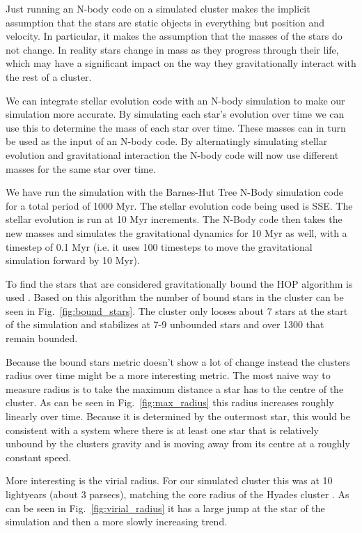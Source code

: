 \documentclass{aa}
\begin{document}
Just running an N-body code on a simulated cluster makes the implicit assumption that the stars are static objects in everything but position and velocity. In particular, it makes the assumption that the masses of the stars do not change. In reality stars change in mass as they progress through their life, which may have a significant impact on the way they gravitationally interact with the rest of a cluster.

We can integrate stellar evolution code with an N-body simulation to make our simulation more accurate. By simulating each star's evolution over time we can use this to determine the mass of each star over time. These masses can in turn be used as the input of an N-body code. By alternatingly simulating stellar evolution and gravitational interaction the N-body code will now use different masses for the same star over time.

We have run the simulation with the Barnes-Hut Tree N-Body simulation code \citep{1986Natur.324..446B} for a total period of 1000 Myr. The stellar evolution code being used is SSE. The stellar evolution is run at 10 Myr increments. The N-Body code then takes the new masses and simulates the gravitational dynamics for 10 Myr as well, with a timestep of 0.1 Myr (i.e. it uses 100 timesteps to move the gravitational simulation forward by 10 Myr).

To find the stars that are considered gravitationally bound the HOP algorithm is used \citep{1998ApJ...498..137E}. Based on this algorithm the number of bound stars in the cluster can be seen in Fig.~\ref{fig:bound_stars}. The cluster only looses about 7 stars at the start of the simulation and stabilizes at 7-9 unbounded stars and over 1300 that remain bounded. 

Because the bound stars metric doesn't show a lot of change instead the clusters radius over time might be a more interesting metric. The most naive way to measure radius is to take the maximum distance a star has to the centre of the cluster. As can be seen in Fig.~\ref{fig:max_radius} this radius increases roughly linearly over time. Because it is determined by the outermost star, this would be consistent with a system where there is at least one star that is relatively unbound by the clusters gravity and is moving away from its centre at a roughly constant speed. 

More interesting is the virial radius. For our simulated cluster this was at 10 lightyears (about 3 parsecs), matching the core radius of the Hyades cluster \citep{2009AIPC.1094..497B}. As can be seen in Fig.~\ref{fig:virial_radius} it has a large jump at the star of the simulation and then a more slowly increasing trend.
\end{document}
